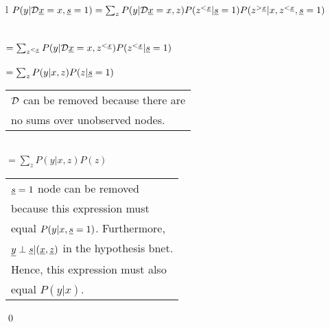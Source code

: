 \begin{claim}
\label{cl-decSBBackDoor}
\decSBBackDoor
\end{claim}
\proof
\begin{longtable}{l}
\color{red}
$P(y|{\cal D}{\underline{x}} =x, {\underline{s}}=1)=
\sum_z
P(y|{\cal D}{\underline{x}}=x, z)P(z^{<{\underline{x}}}|{\underline{s}}=1)
P(z^{>{\underline{x}}}|x,z^{<{\underline{x}}}, {\underline{s}}=1)$
\\
\\
\\
\color{red}
$= \sum_{z^{<{\underline{x}}}} P(y|{\cal D}{\underline{x}}=x, z^{<{\underline{x}}})
P(z^{<{\underline{x}}}|{\underline{s}}=1)$
\\
\xymatrix{\\=}
\\
\color{red}
$= \sum_z P(y|x, z)
P(z|{\underline{s}}=1)$
\\
\xymatrix{\\=}
\begin{tabular}{l}
${\cal D}$ can be removed because there are\\
no sums over unobserved nodes.
\end{tabular}
\\
\color{red}
$= \sum_z P(y|x, z)
P(z)$
\\
\xymatrix{\\=}
\begin{tabular}{l}
${\underline{s}}=1$ node can be removed\\ because
this expression must\\ equal
$P(y|x, {\underline{s}}=1)$. Furthermore,\\
${\underline{y}}\perp{\underline{s}}|({\underline{x}},{\underline{z}})$ 
in the hypothesis bnet.\\
Hence,  this expression must also
\\ equal $P(y|x)$.
\end{tabular}
\end{longtable}
\qed


%
